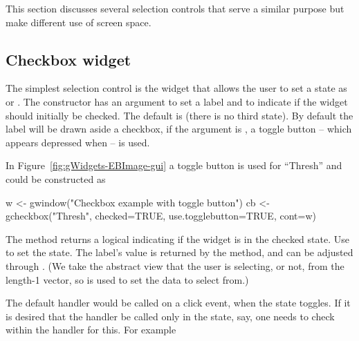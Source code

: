 This section discusses several selection controls that serve a similar
purpose but make different use of screen space.

\subsection{Checkbox widget}
\label{sec:gWidgets-checkbox-widget}

The simplest selection control is the  widget
that allows the user to set a state as  or
. The constructor has an argument
 to set a label and
 to indicate if the widget should
initially be checked. The default is  (there is no third
state). By default the label will be drawn aside a checkbox, if the
argument  is , a
toggle button -- which appears depressed when  -- is used.

In Figure~\ref{fig:gWidgets-EBImage-gui} a toggle button is used for
``Thresh''  and could be constructed as

\begin{Schunk}
\begin{Sinput}
 w <- gwindow("Checkbox example with toggle button")
 cb <- gcheckbox("Thresh", checked=TRUE, use.togglebutton=TRUE, cont=w)
\end{Sinput}
\end{Schunk}

The  method returns a logical indicating if
the widget is in the checked state. Use  to set
the state. The label's value is returned by the
\method{[}{gcheckbox} method, and can be adjusted through 
\method{[\ASSIGN}{gcheckbox}. (We take the abstract view that the user
is selecting, or not, from the length-1 vector, so \meth{[} is used to
set the data to select from.)

The default handler would be called on a click event, when the state toggles. If it is desired
that the handler be called only in the  state, say, one
needs to check within the handler for this. For example
\begin{Schunk}
\end{Schunk}


